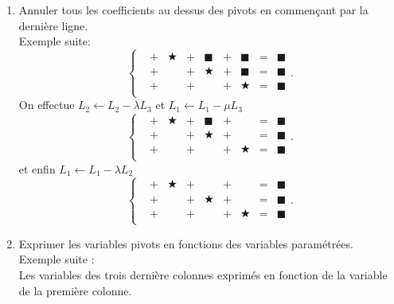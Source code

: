 \documentclass[a4paper]{book}
\begin{document}
\begin{Algorithme}
\begin{enumerate}
$${\begin{matrix}
&+&&+&&+&\bigstar&=&\blacksquare\\
\end{matrix}}\right. .$$
La boucle se termine car chaque ligne contient un pivot.
\item Annuler tous les coefficients au dessus des pivots en commençant par la dernière ligne.\\
Exemple suite:  
$$\left\{{\begin{matrix}
&+&\bigstar&+&\blacksquare&+&\blacksquare&=&\blacksquare\\
&+&&+&\bigstar&+&\blacksquare&=&\blacksquare\\
&+&&+&&+&\bigstar&=&\blacksquare\\
\end{matrix}}\right. .$$
On effectue $L_2\leftarrow L_2 -\lambda L_3$ et $L_1\leftarrow L_1 -\mu L_3$
$$\left\{{\begin{matrix}
&+&\bigstar&+&\blacksquare&+&&=&\blacksquare\\
&+&&+&\bigstar&+&&=&\blacksquare\\
&+&&+&&+&\bigstar&=&\blacksquare\\
\end{matrix}}\right. .$$
et enfin $L_1\leftarrow L_1 -\lambda L_2$
$$\left\{{\begin{matrix}
&+&\bigstar&+&&+&&=&\blacksquare\\
&+&&+&\bigstar&+&&=&\blacksquare\\
&+&&+&&+&\bigstar&=&\blacksquare\\
\end{matrix}}\right. .$$
\item Exprimer les variables pivots en fonctions des variables paramétrées.\\
Exemple suite :\\  
Les variables des trois dernière colonnes exprimés en fonction de la variable de la première colonne.
\end{enumerate}
\end{Algorithme}
\end{document}
